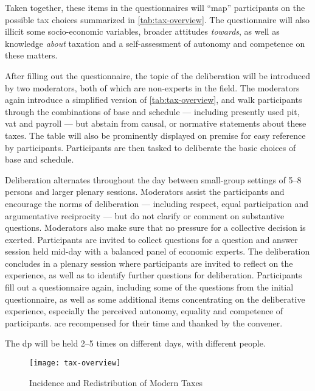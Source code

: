 Taken together, these items in the questionnaires will ``map'' participants on the possible tax choices summarized in \autoref{tab:tax-overview}.
The questionnaire will also illicit some socio-economic variables, broader attitudes \emph{towards}, as well as knowledge \emph{about} taxation and a self-assessment of autonomy and competence on these matters.

After filling out the questionnaire, the topic of the deliberation will be introduced by two moderators, both of which are non-experts in the field.
The moderators again introduce a simplified version of \autoref{tab:tax-overview}, and walk participants through the combinations of base and schedule --- including presently used \gls{pit}, \gls{vat} and \gls{payroll} --- but abstain from causal, or normative statements about these taxes.
The table will also be prominently displayed on premise for easy reference by participants.
Participants are then tasked to deliberate the basic choices of base and schedule.

Deliberation alternates throughout the day between small-group settings of 5--8 persons and larger plenary sessions.
Moderators assist the participants and encourage the norms of deliberation --- including respect, equal participation and argumentative reciprocity --- but do not clarify or comment on substantive questions.
Moderators also make sure that no pressure for a collective decision is exerted.
Participants are invited to collect questions for a question and answer session held mid-day with a balanced panel of economic experts.
The deliberation concludes in a plenary session where participants are invited to reflect on the experience, as well as to identify further questions for deliberation.
Participants fill out a questionnaire again, including some of the questions from the initial questionnaire, as well as some additional items concentrating on the deliberative experience, especially the perceived autonomy, equality and competence of participants.
 are recompensed for their time and thanked by the convener.

The \gls{dp} will be held 2--5 times on different days, with different people.

\begin{landscape}
 \begin{figure}[htbp]
    \begin{center}
	\texttt{[image: tax-overview]}
	\caption{Incidence and Redistribution of Modern Taxes}
	\label{tab:tax-overview}
	\end{center}
	
\end{figure}
\end{landscape}

